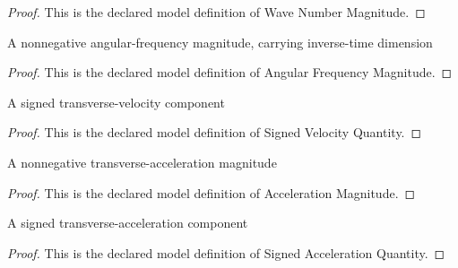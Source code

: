 \begin{proof}
  This is the declared model definition of Wave Number Magnitude.
\end{proof}
\begin{definition}
  \label{def:physics:phyx-mini-0302:phyxminiproblems-problemphyxmini0302-angularfrequencymagnitude}
  A nonnegative angular-frequency magnitude, carrying inverse-time dimension
\end{definition}
\begin{proof}
  This is the declared model definition of Angular Frequency Magnitude.
\end{proof}
\begin{definition}
  \label{def:physics:phyx-mini-0302:phyxminiproblems-problemphyxmini0302-signedvelocityquantity}
  A signed transverse-velocity component
\end{definition}
\begin{proof}
  This is the declared model definition of Signed Velocity Quantity.
\end{proof}
\begin{definition}
  \label{def:physics:phyx-mini-0302:phyxminiproblems-problemphyxmini0302-accelerationmagnitude}
  A nonnegative transverse-acceleration magnitude
\end{definition}
\begin{proof}
  This is the declared model definition of Acceleration Magnitude.
\end{proof}
\begin{definition}
  \label{def:physics:phyx-mini-0302:phyxminiproblems-problemphyxmini0302-signedaccelerationquantity}
  A signed transverse-acceleration component
\end{definition}
\begin{proof}
  This is the declared model definition of Signed Acceleration Quantity.
\end{proof}
